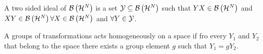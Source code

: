 \begin{references}
 A two sided ideal of ${\cal B}\left( {\cal H}^{N}\right) $
is a set ${\cal Y\subseteq B}\left( {\cal H}^{N}\right) $ such that $YX\in 
{\cal B}\left( {\cal H}^{N}\right) $ and $XY\in {\cal B}\left( {\cal H}%
^{N}\right) \forall X\in {\cal B}\left( {\cal H}^{N}\right) $ and $\forall
Y\in {\cal Y}$.

 A groups of transformations acts homogeneously on a space
if fro every $Y_{1}$ and $Y_{2}$ that belong to the space there exists a
group element $g$ such that $Y_{1}=gY_{2}$.
\end{references}

